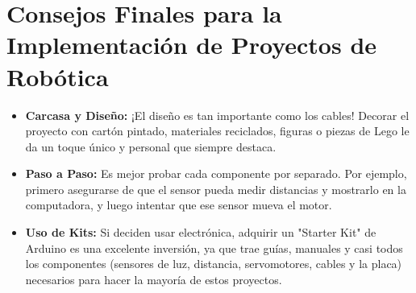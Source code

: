 \documentclass[12pt,a4paper]{article}
\begin{document}
\section{Consejos Finales para la Implementación de Proyectos de Robótica}
\begin{itemize}
    \item \textbf{Carcasa y Diseño:} ¡El diseño es tan importante como los cables! Decorar el proyecto con cartón pintado, materiales reciclados, figuras o piezas de Lego le da un toque único y personal que siempre destaca.
    \item \textbf{Paso a Paso:} Es mejor probar cada componente por separado. Por ejemplo, primero asegurarse de que el sensor pueda medir distancias y mostrarlo en la computadora, y luego intentar que ese sensor mueva el motor.
    \item \textbf{Uso de Kits:} Si deciden usar electrónica, adquirir un "Starter Kit" de Arduino es una excelente inversión, ya que trae guías, manuales y casi todos los componentes (sensores de luz, distancia, servomotores, cables y la placa) necesarios para hacer la mayoría de estos proyectos.
\end{itemize}
\end{document}
